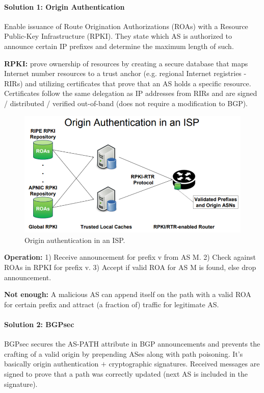 \paragraph{Solution 1: Origin Authentication}
Enable issuance of Route Origination Authorizations (ROAs) with a Resource Public-Key Infrastructure (RPKI). They state which AS is authorized to announce certain IP prefixes and determine the maximum length of such.

\textbf{RPKI:} prove ownership of resources by creating a secure database that maps Internet number resources to a trust anchor (e.g. regional Internet registries - RIRs) and utilizing certificates that prove that an AS holds a specific resource. Certificates follow the same delegation as IP addresses from RIRs and are signed / distributed / verified out-of-band (does not require a modification to BGP).

\begin{figure}[h]
	\centering
	\includegraphics[scale=0.5]{images/8-origin.PNG}
	\caption{Origin authentication in an ISP.}
	\label{fig:bgp1}
\end{figure}

\textbf{Operation:} 1) Receive announcement for prefix v from AS M. 2) Check against ROAs in RPKI for prefix v. 3) Accept if valid ROA for AS M is found, else drop announcement.

\textbf{Not enough:} A malicious AS can append itself on the path with a valid ROA for certain prefix and attract (a fraction of) traffic for legitimate AS.

\paragraph{Solution 2: BGPsec}
BGPsec secures the AS-PATH attribute in BGP announcements and prevents the crafting of a valid origin by prepending ASes along with path poisoning. It's basically origin authentication $+$ cryptographic signatures. Received messages are signed to prove that a path was correctly updated (next AS is included in the signature). %

